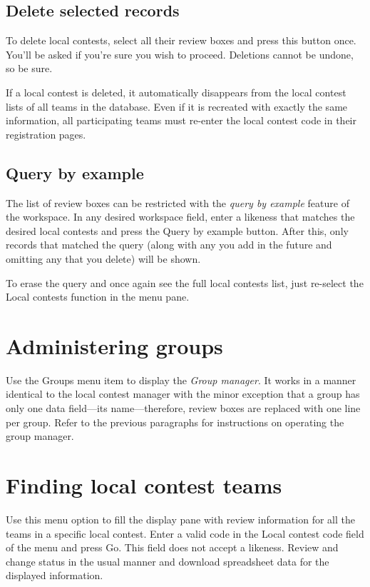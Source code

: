 \documentclass[11pt,letterpaper]{refart}
\def\ui#1{\textsf{#1}}
\begin{document}
\subsection{Delete selected records}
To delete local contests, select all their review boxes and press this button
once.  You'll be asked if you're sure you wish to proceed.  Deletions cannot
be undone, so be sure.  

If a local contest is deleted, it automatically disappears from the local contest
lists of all teams in the database.  Even if it is recreated with exactly the same
information, all participating teams must re-enter the local contest code in
their registration pages.

\subsection{Query by example}
The list of review boxes can be restricted with the \emph{query by example}
feature of the workspace.  In any desired workspace field, enter a likeness
that matches the desired local contests and press the \ui{Query by example}
button. After this, only records that matched the query (along with any you
add in the future and omitting any that you delete) will be shown.

To erase the query and once again see the full local contests list, just re-select
the \ui{Local contests} function in the menu pane.

\section{Administering groups}
Use the \ui{Groups} menu item to display the \emph{Group manager}.  It 
works in a manner identical to the local contest manager with the minor 
exception that a group has only one data field---its name---therefore,
review boxes are replaced with one line per group.  Refer to the previous
paragraphs for instructions on operating the group manager.

\section{Finding local contest teams}
Use this menu option to fill the display pane with review information for all the
teams in a specific local contest.  
Enter a valid code in the \ui{Local contest code} field of the menu
and press \ui{Go}.  This field does not accept a likeness.
Review and change status in the usual 
manner and download spreadsheet data for the displayed information.
\end{document}
